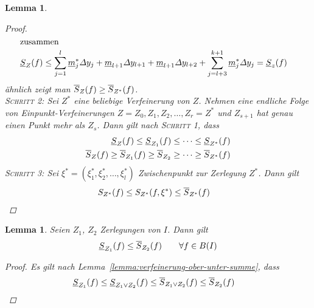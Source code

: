 \documentclass[11pt, twoside, a4paper]{article}
\theoremstyle{plain}
\newtheorem{lemma}[blockelement]{Lemma}
\newcommand{\pair}[1]{\left(#1\right)}
\newcommand{\of}[1]{\mathopen{}\mathclose{}\bgroup\left(#1\aftergroup\egroup\right)}
\begin{document}
\begin{lemma}
\begin{proof}
\begin{align*}
                \intertext{zusammen}
                \underline{S}_{Z}\of{f} &\leq \sum_{j=1}^{l} \underline{m}_j^{*} \varDelta y_j + \underline{m}_{l+1} \varDelta y_{l+1} + \underline{m}_{l+1}\varDelta y_{l+2} + \sum_{j=l+3}^{k+1} \underline{m}_j^{*}\varDelta y_j = \underline{S}_{z}\of{f}
            \end{align*}
            ähnlich zeigt man $\overline{S}_Z\of{f} \geq \overline{S}_{Z^{*}}\of{f}$.\\
            \textsc{Schritt 2:} Sei $Z^{*}$ eine beliebige Verfeinerung von $Z$. Nehmen eine endliche Folge von Einpunkt-Verfeinerungen $Z=Z_0, Z_1, Z_2, \dots, Z_r = Z^{*}$ und $Z_{s+1}$ hat genau einen Punkt mehr als $Z_{s}$. Dann gilt nach \textsc{Schritt 1}, dass
            \begin{align*}
                \underline{S}_{Z}\of{f} \leq \underline{S}_{Z_1}\of{f} \leq \dots \leq \underline{S}_{Z^{*}}\of{f}\\
                \overline{S}_{Z}\of{f} \geq \overline{S}_{Z_1}\of{f} \geq \overline{S}_{Z_2} \geq \dots \geq \overline{S}_{Z^{*}}\of{f}
            \end{align*}
            \textsc{Schritt 3:} Sei $\xi^{*} = \pair{\xi_1^{*}, \xi_2^{*}, \dots, \xi_l^{*}}$ Zwischenpunkt zur Zerlegung $Z^{*}$. Dann gilt
            \begin{align*}
                S_{Z^{*}}\of{f} \leq S_{Z^*}\of{f, \xi^{*}} &\leq \overline{S}_{Z^*}\of{f}\qedhere
            \end{align*}
        \end{proof}
    \end{lemma}

    \begin{lemma} %
        \label{lemma:ober-unter-summe-zerlegung}
        Seien $Z_1$, $Z_2$ Zerlegungen von $I$. Dann gilt
        \begin{align*}
            \underline{S}_{Z_1}\of{f} \leq \overline{S}_{Z_2}\of{f}\qquad\forall f\in B\of{I}
        \end{align*}
        \begin{proof}
            Es gilt nach Lemma~\ref{lemma:verfeinerung-ober-unter-summe}, dass
            \begin{align*}
                \underline{S}_{Z_1}\of{f} &\leq \underline{S}_{Z_1\lor Z_2}\of{f}\leq \overline{S}_{Z_1\lor Z_2}\of{f} \leq \overline{S}_{Z_2}\of{f}\qedhere
            \end{align*}
        \end{proof}
    \end{lemma}
\end{document}
